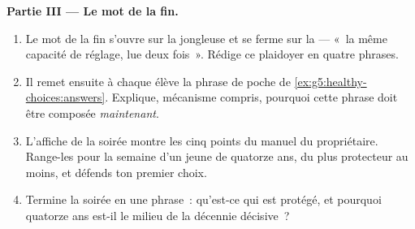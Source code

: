 \begin{problem}
\medskip\noindent\textbf{Partie III --- Le mot de la
fin.}
\begin{enumerate}[resume]
  \item Le mot de la fin s'ouvre sur la jongleuse et se
        ferme sur la  --- «~la même capacité de
        réglage, lue deux fois~». Rédige ce plaidoyer en
        quatre phrases.
  \item Il remet ensuite à chaque élève la phrase de poche
        de \cref{ex:g5:healthy-choices:answers}. Explique,
        mécanisme compris, pourquoi cette phrase doit être
        composée \emph{maintenant}.
  \item L'affiche de la soirée montre les cinq points du
        manuel du propriétaire. Range-les pour la semaine
        d'un jeune de quatorze ans, du plus protecteur au
        moins, et défends ton premier choix.
  \item Termine la soirée en une phrase~: qu'est-ce qui est
        protégé, et pourquoi quatorze ans est-il le milieu
        de la décennie décisive~?
\end{enumerate}
\end{problem}
